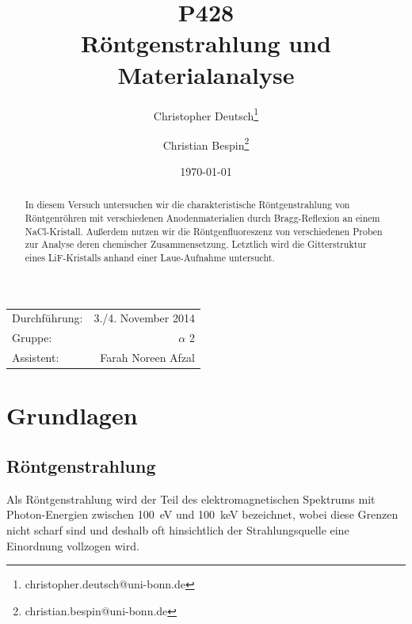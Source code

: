 \documentclass[11pt, a4paper]{article}
\title{P428 \\ Röntgenstrahlung und Materialanalyse}
\author{Christopher Deutsch\footnote{christopher.deutsch@uni-bonn.de} \and Christian Bespin\footnote{christian.bespin@uni-bonn.de}}
\date{\today}
\begin{document}
\maketitle

\begin{center}
\begin{tabular}{l r}
Durchführung: & 3./4. November 2014 \\
Gruppe: & $\alpha$ 2 \\
Assistent: & Farah Noreen Afzal
\end{tabular}
\end{center}

\null\vspace{23pt}
\begin{abstract}
\noindent
In diesem Versuch untersuchen wir die charakteristische Röntgenstrahlung von Röntgenröhren mit verschiedenen Anodenmaterialien durch Bragg-Reflexion an einem NaCl-Kristall.
Außerdem nutzen wir die Röntgenfluoreszenz von verschiedenen Proben zur Analyse deren chemischer Zusammensetzung.
Letztlich wird die Gitterstruktur eines LiF-Kristalls anhand einer Laue-Aufnahme untersucht.
\end{abstract}


\newpage
\tableofcontents
\newpage


\section{Grundlagen}
\subsection{Röntgenstrahlung}
Als Röntgenstrahlung wird der Teil des elektromagnetischen Spektrums mit Photon-Energien zwischen \SI{100}{\electronvolt} und \SI{100}{\kilo\electronvolt} bezeichnet, wobei diese Grenzen nicht scharf sind und deshalb oft hinsichtlich der Strahlungsquelle eine Einordnung vollzogen wird.
\end{document}
